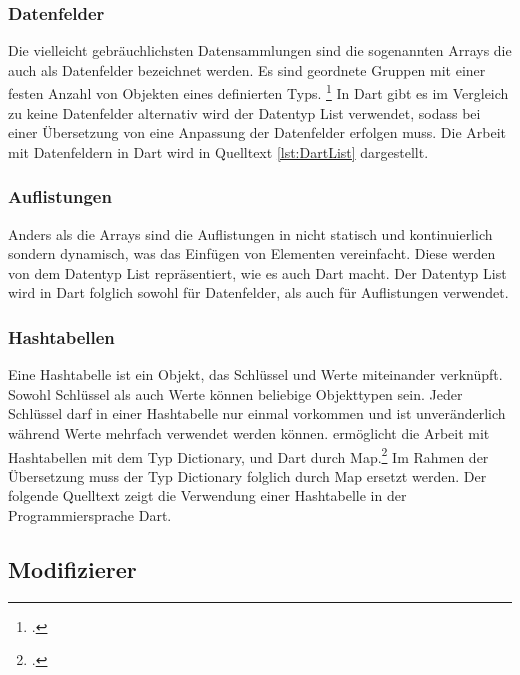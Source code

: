 \subsubsection{Datenfelder}

Die vielleicht gebräuchlichsten Datensammlungen sind die sogenannten \glq Arrays\grq{} die auch als Datenfelder bezeichnet werden.  Es sind geordnete Gruppen mit einer festen Anzahl von Objekten eines definierten Typs. \footcite[Vgl.][S. 110f]{Kühnel2019} In Dart gibt es im Vergleich zu \Csharp keine Datenfelder alternativ  wird der Datentyp \glq List\grq{}  verwendet,  sodass bei einer Übersetzung von \Csharp eine Anpassung der Datenfelder erfolgen muss.  Die Arbeit mit Datenfeldern in Dart wird in Quelltext \ref{lst:DartList} dargestellt.



\subsubsection{Auflistungen}
Anders als die \glq Arrays\grq{}  sind die Auflistungen in \Csharp nicht statisch und kontinuierlich sondern dynamisch, was das Einfügen von Elementen vereinfacht.   Diese werden von dem Datentyp \glq List\grq{} repräsentiert,  wie es auch Dart macht.  Der Datentyp \glq List\grq{}  wird in Dart folglich sowohl für Datenfelder,  als auch für Auflistungen verwendet.

\subsubsection{Hashtabellen}

Eine Hashtabelle ist ein Objekt, das Schlüssel und Werte miteinander verknüpft. Sowohl Schlüssel als auch Werte können beliebige Objekttypen sein.  Jeder Schlüssel darf in einer Hashtabelle nur einmal vorkommen und ist unveränderlich während Werte mehrfach verwendet werden können.  
\Csharp ermöglicht die Arbeit mit Hashtabellen mit dem Typ Dictionary,  und Dart durch Map.\footcite[Vgl. ][Abgerufen am \today]{GoogleFlutterTour2020} Im Rahmen der Übersetzung muss der Typ Dictionary folglich durch Map ersetzt werden.  Der folgende Quelltext zeigt die Verwendung einer Hashtabelle in der Programmiersprache Dart.



\subsection{Modifizierer}

